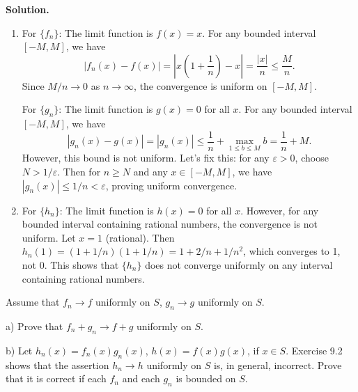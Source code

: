 \noindent\textbf{Solution.} 
\begin{enumerate}[label=(\alph*)]
\item For \(\{f_n\}\): The limit function is \( f(x) = x \). For any bounded interval \([-M, M]\), we have
\[|f_n(x) - f(x)| = \left|x \left(1 + \frac{1}{n}\right) - x\right| = \frac{|x|}{n} \leq \frac{M}{n}.\]
Since \( M/n \to 0 \) as \( n \to \infty \), the convergence is uniform on \([-M, M]\).

For \(\{g_n\}\): The limit function is \( g(x) = 0 \) for all \( x \). For any bounded interval \([-M, M]\), we have
\[|g_n(x) - g(x)| = |g_n(x)| \leq \frac{1}{n} + \max_{1 \leq b \leq M} b = \frac{1}{n} + M.\]
However, this bound is not uniform. Let's fix this: for any \( \varepsilon > 0 \), choose \( N > 1/\varepsilon \). Then for \( n \geq N \) and any \( x \in [-M, M] \), we have \( |g_n(x)| \leq 1/n < \varepsilon \), proving uniform convergence.

\item For \(\{h_n\}\): The limit function is \( h(x) = 0 \) for all \( x \). However, for any bounded interval containing rational numbers, the convergence is not uniform. Let \( x = 1 \) (rational). Then \( h_n(1) = (1 + 1/n)(1 + 1/n) = 1 + 2/n + 1/n^2 \), which converges to 1, not 0. This shows that \(\{h_n\}\) does not converge uniformly on any interval containing rational numbers.
\end{enumerate}

\begin{problembox}
Assume that \( f_n \to f \) uniformly on \( S \), \( g_n \to g \) uniformly on \( S \).

a) Prove that \( f_n + g_n \to f + g \) uniformly on \( S \).

b) Let \( h_n(x) = f_n(x) g_n(x) \), \( h(x) = f(x) g(x) \), if \( x \in S \). Exercise 9.2 shows that the assertion \( h_n \to h \) uniformly on \( S \) is, in general, incorrect. Prove that it is correct if each \( f_n \) and each \( g_n \) is bounded on \( S \).
\end{problembox}

